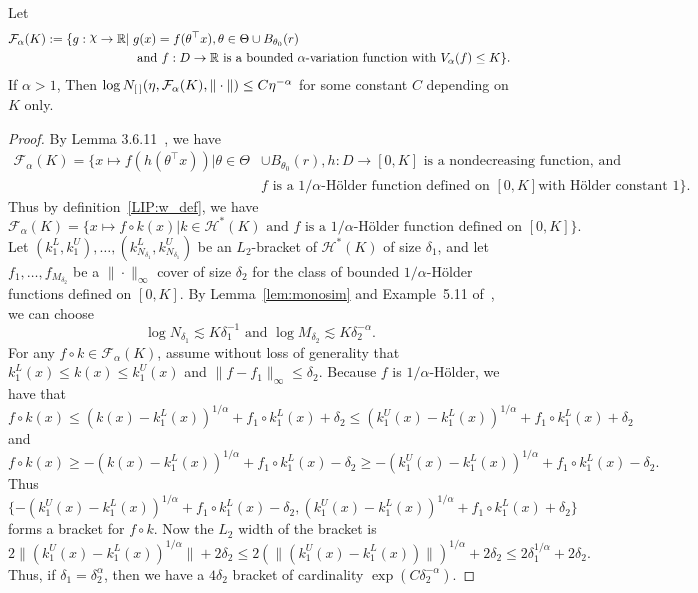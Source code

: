 {\begin{lemma}\label{lem:ent_alpa_variation}
Let \begin{align}\label{eq:F_gamma_def_orig}
\mathcal{F}_{\alpha}(K):= \{g: \rchi\to \R|\; &g(x)= f(\theta^\top x), \theta \in \Theta \cup B_{\theta_0}(r)\\ 
& \text{ and } f: D\to \R \text{ is a bounded $\alpha$-variation function with } V_\alpha(f) \le K\}.
\end{align}
 If $\alpha > 1$, Then 
$\log N_{[\,]}(\eta, \mathcal{F}_{\alpha}(K), \|\cdot\|) \le C \eta^{-\alpha}$ for some constant $C$ depending on $K$ only.
\end{lemma}
\begin{proof}
By Lemma 3.6.11~\cite{Gine16}, we have  \begin{align}\label{eq:F_gamma_def_orig1}
\mathcal{F}_{\alpha}(K)= \{x\mapsto f  (h(\theta^\top x))| \theta \in \Theta &\cup B_{\theta_0}(r), h: D \to [0, K] \text{ is a nondecreasing function, and } \\&f \text{ is a $1/\alpha$-H\"{o}lder function defined on } [0, K] \text{with H\"{o}lder constant }1  \}.
\end{align}
Thus by definition~\eqref{LIP:w_def}, we have 
\[\mathcal{F}_{\alpha}(K)= \{x\mapsto f \circ k(x)| k \in \mathcal{H}^*(K) \text{ and }f \text{ is a $1/\alpha$-H\"{o}lder function defined on } [0, K] \}.\]
Let $(k_1^L, k_1^U), \ldots, (k_{N_{\delta_1}}^L ,k_{N_{\delta_1}}^U )$ be an $L_2$-bracket of $\mathcal{H}^*(K)$ of size $\delta_1$, and let $f_1, \ldots, f_{M_{\delta_2}}$ be a $\|\cdot\|_{\infty}$ cover of size $\delta_2$ for the class of bounded $1/\alpha$-H\"{o}lder functions defined on $[0, K]$. By Lemma~\ref{lem:monosim} and Example~5.11 of~\cite{wainwright2019high}, we can choose 
\[ \log N_{\delta_1} \lesssim K \delta_1^{-1} \text{   and   }  \log M_{\delta_2} \lesssim  K \delta_2^{-\alpha}.\] 
For any $f\circ k \in \mathcal{F}_{\alpha}(K)$, assume without loss of generality that $k_1^L(x)\le k(x) \le k_1^U(x)$ and $\|f-f_1\|_{\infty} \le \delta_2.$ Because $f$ is $1/\alpha$-H\"{o}lder, we have that 
\[f\circ k(x)  \le  (k(x)- k_1^L(x))^{1/\alpha}+  f_1 \circ k_1^L(x) + \delta_2 \le  (k_1^U(x)- k_1^L(x))^{1/\alpha}+  f_1 \circ k_1^L(x) + \delta_2   \]
and 
\[f\circ k(x)  \ge - (k(x)- k_1^L(x))^{1/\alpha}+  f_1 \circ k_1^L(x) - \delta_2\ge - (k_1^U(x)- k_1^L(x))^{1/\alpha}+  f_1 \circ k_1^L(x) - \delta_2 .\]
Thus $\{- (k_1^U(x)- k_1^L(x))^{1/\alpha}+  f_1 \circ k_1^L(x) - \delta_2,  (k_1^U(x)- k_1^L(x))^{1/\alpha}+  f_1 \circ k_1^L(x) + \delta_2\}$ forms a bracket for $f\circ k. $ Now the $L_2$ width of the bracket is 
\[2  \|(k_1^U(x)- k_1^L(x))^{1/\alpha}\| + 2 \delta_2 \le 2  (\|(k_1^U(x)- k_1^L(x))\|)^{1/\alpha} + 2 \delta_2\le2  \delta_1^{1/\alpha} + 2 \delta_2.\]
Thus, if  $\delta_1 = \delta_2^{\alpha}$, then we have a $4\delta_2$ bracket of cardinality $\exp(C \delta_2^{-\alpha})$. 
\end{proof}
}
